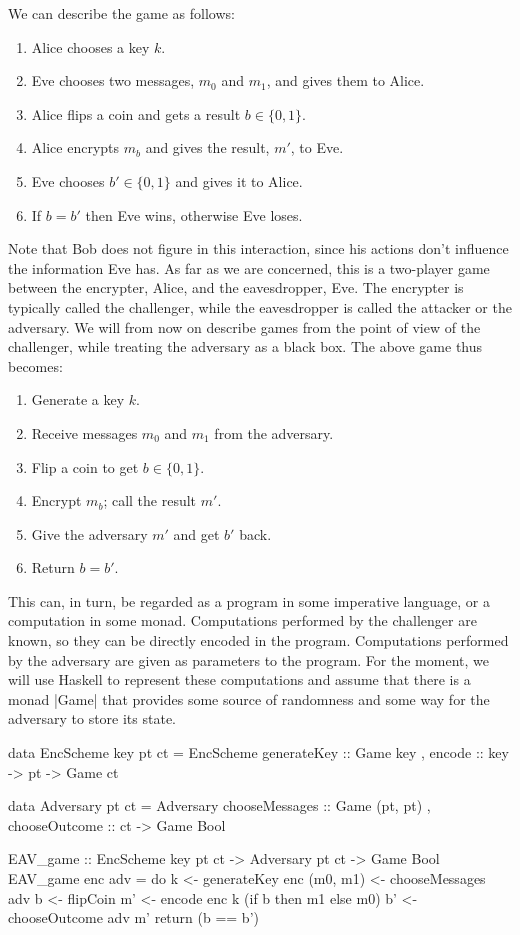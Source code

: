 We can describe the game as follows:
\begin{enumerate}
    \itemsep0em
    \item Alice chooses a key $k$.
    \item Eve chooses two messages, $m_0$ and $m_1$, and gives them to Alice.
    \item Alice flips a coin and gets a result $b \in \{0, 1\}$.
    \item Alice encrypts $m_b$ and gives the result, $m'$, to Eve.
    \item Eve chooses $b' \in \{0, 1\}$ and gives it to Alice.
    \item If $b = b'$ then Eve wins, otherwise Eve loses.
\end{enumerate}

Note that Bob does not figure in this interaction, since his actions don't influence the information Eve has.  As far as
we are concerned, this is a two-player game between the encrypter, Alice, and the eavesdropper, Eve.  The encrypter is
typically called the challenger, while the eavesdropper is called the attacker or the adversary.  We will from now on
describe games from the point of view of the challenger, while treating the adversary as a black box.  The above game
thus becomes:
\begin{enumerate}
    \itemsep0em
    \item Generate a key $k$.
    \item Receive messages $m_0$ and $m_1$ from the adversary.
    \item Flip a coin to get $b \in \{0, 1\}$.
    \item Encrypt $m_b$; call the result $m'$.
    \item Give the adversary $m'$ and get $b'$ back.
    \item Return $b = b'$.
\end{enumerate}

This can, in turn, be regarded as a program in some imperative language, or a computation in some monad.  Computations
performed by the challenger are known, so they can be directly encoded in the program.  Computations performed by the
adversary are given as parameters to the program.  For the moment, we will use Haskell to represent these computations
and assume that there is a monad |Game| that provides some source of randomness and some way for the adversary to
store its state.
\begin{code}
data EncScheme key pt ct = EncScheme
                         { generateKey :: Game key
                         , encode :: key -> pt -> Game ct
                         }

data Adversary pt ct = Adversary
                     { chooseMessages :: Game (pt, pt)
                     , chooseOutcome :: ct -> Game Bool
                     }

EAV_game :: EncScheme key pt ct -> Adversary pt ct -> Game Bool
EAV_game enc adv = do
    k <- generateKey enc
    (m0, m1) <- chooseMessages adv
    b <- flipCoin
    m' <- encode enc k (if b then m1 else m0)
    b' <- chooseOutcome adv m'
    return (b == b')
\end{code}

